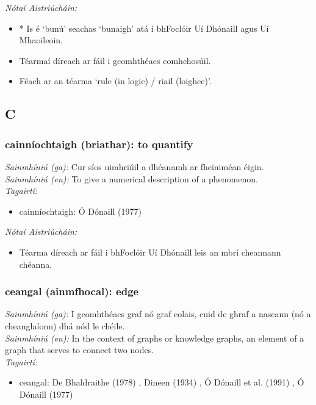 \documentclass{article}
\begin{document}
 \noindent \textit{Nótaí Aistriúcháin:}
\begin{itemize}
	\item * Is é `bunú' seachas `bunaigh' atá i bhFoclóir Uí Dhónaill agus Uí Mhaoileoin.
	\item Téarmaí díreach ar fáil i gcomhthéacs comhchosúil.
	\item Féach ar an téarma `rule (in logic) / riail (loighce)'.
\end{itemize}


\subsection*{C}

\subsubsection*{cainníochtaigh (briathar): to quantify}
 \noindent \textit{Sainmhíniú (ga):} Cur síos uimhriúil a dhéanamh ar fheiniméan éigin.
\\
 \noindent \textit{Sainmhíniú (en):} To give a numerical description of a phenomenon.
\\
 \noindent \textit{Tagairtí:}
\begin{itemize}
	\item cainníochtaigh: Ó Dónaill (1977) \cite{odonaill}
\end{itemize}

 \noindent \textit{Nótaí Aistriúcháin:}
\begin{itemize}
	\item Téarma díreach ar fáil i bhFoclóir Uí Dhónaill leis an mbrí cheannann chéanna.
\end{itemize}


\subsubsection*{ceangal (ainmfhocal): edge}
 \noindent \textit{Sainmhíniú (ga):} I gcomhthéacs graf nó graf eolais, cuid de ghraf a nascann (nó a cheanglaíonn) dhá nód le chéile.
\\
 \noindent \textit{Sainmhíniú (en):} In the context of graphs or knowledge graphs, an element of a graph that serves to connect two nodes.
\\
 \noindent \textit{Tagairtí:}
\begin{itemize}
	\item ceangal: De Bhaldraithe (1978) \cite{de-bhaldraithe}, Dineen (1934) \cite{dineen}, Ó Dónaill et al. (1991) \cite{focloir-beag}, Ó Dónaill (1977) \cite{odonaill}
\end{itemize}
\end{document}
